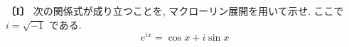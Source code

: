 \noindent\textbf{〔I〕}
次の関係式が成り立つことを, マクローリン展開を用いて示せ. ここで $i=\sqrt{-1}$ である.
\[
e^{ix}=\cos x+i\sin x
\]

